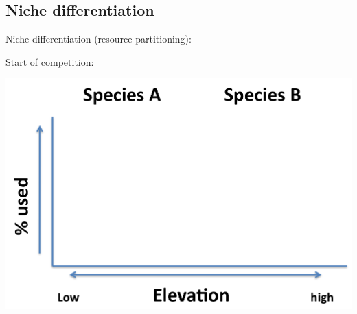 \subsection{Niche differentiation}

\begin{frame}[t]
    \begin{adjustwidth}{-2em}{-1.5em}
        \vspace{-3mm}
        Niche differentiation (resource partitioning):


        Start of competition:
        \vspace{-2mm}
        \begin{center}
        \includegraphics[height=0.75\textheight]{draw-niche-diff-elevation.png}
        \end{center}


    \end{adjustwidth}
\end{frame}

